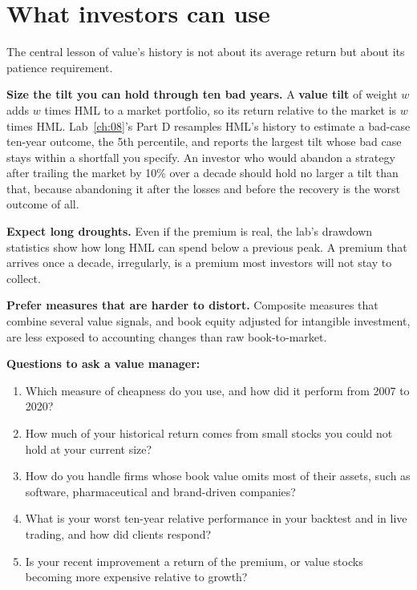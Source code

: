 \section{What investors can use}
\label{sec:08-investors}

The central lesson of value's history is not about its average return but about its patience requirement.

\textbf{Size the tilt you can hold through ten bad years.} A \textbf{value tilt} of weight $w$ adds $w$ times HML to a market portfolio, so its return relative to the market is $w$ times HML. Lab~\ref{ch:08}'s Part D resamples HML's history to estimate a bad-case ten-year outcome, the 5th percentile, and reports the largest tilt whose bad case stays within a shortfall you specify. An investor who would abandon a strategy after trailing the market by 10\% over a decade should hold no larger a tilt than that, because abandoning it after the losses and before the recovery is the worst outcome of all.

\textbf{Expect long droughts.} Even if the premium is real, the lab's drawdown statistics show how long HML can spend below a previous peak. A premium that arrives once a decade, irregularly, is a premium most investors will not stay to collect.

\textbf{Prefer measures that are harder to distort.} Composite measures that combine several value signals, and book equity adjusted for intangible investment, are less exposed to accounting changes than raw book-to-market.

\textbf{Questions to ask a value manager:}

\begin{enumerate}
  \item Which measure of cheapness do you use, and how did it perform from 2007 to 2020?
  \item How much of your historical return comes from small stocks you could not hold at your current size?
  \item How do you handle firms whose book value omits most of their assets, such as software, pharmaceutical and brand-driven companies?
  \item What is your worst ten-year relative performance in your backtest and in live trading, and how did clients respond?
  \item Is your recent improvement a return of the premium, or value stocks becoming more expensive relative to growth?
\end{enumerate}


